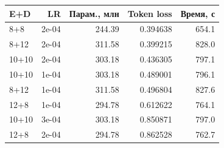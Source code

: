 \begin{tabular}{lrrrr}
\toprule
E+D & LR & Парам., млн & Token loss & Время, с \\
\midrule
8+8 & 2e-04 & 244.39 & 0.394638 & 654.1 \\
8+12 & 2e-04 & 311.58 & 0.399215 & 828.0 \\
10+10 & 2e-04 & 303.18 & 0.436305 & 797.1 \\
10+10 & 1e-04 & 303.18 & 0.489001 & 796.1 \\
8+12 & 1e-04 & 311.58 & 0.496804 & 827.6 \\
12+8 & 1e-04 & 294.78 & 0.612622 & 764.1 \\
10+10 & 3e-04 & 303.18 & 0.850871 & 797.0 \\
12+8 & 2e-04 & 294.78 & 0.862528 & 762.7 \\
\bottomrule
\end{tabular}
